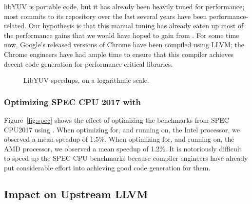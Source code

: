 libYUV is portable code, but it has already been heavily tuned for
performance; most commits to its repository over the last several
years have been performance-related.
%
Our hypothesis is that this manual tuning has already eaten up most of
the performance gains that we would have hoped to gain from \minotaur{}.
%
For some time now, Google's released versions of Chrome have been
compiled using LLVM; the Chrome engineers have had ample time to
ensure that this compiler achieves decent code generation for
performance-critical libraries.
\begin{figure}[tbp]
  \centering
  \hfill
  \caption{LibYUV speedups, on a logarithmic scale.}
  \label{fig:yuv}
\end{figure}




\subsubsection{Optimizing SPEC CPU 2017 with \minotaur{}}

Figure~\ref{fig:spec} shows the effect of optimizing the benchmarks
from SPEC CPU2017 using \minotaur.
%
When optimizing for, and running on, the Intel processor, we observed
a mean speedup of 1.5\%.
%
When optimizing for, and running on, the AMD processor, we observed a
mean speedup of 1.2\%.
%
It is notoriously difficult to speed up the SPEC CPU benchmarks
because compiler engineers have already put considerable effort into
achieving good code generation for them.



\subsection{Impact on Upstream LLVM}

